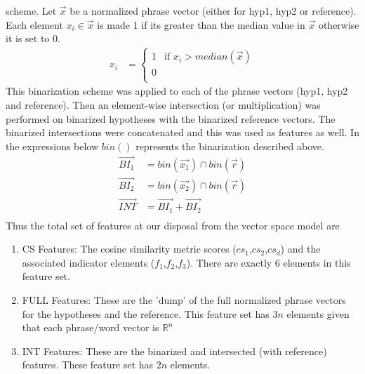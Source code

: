 \documentclass[11pt]{article}
\begin{document}
scheme. Let $\vec{x}$ be a normalized phrase vector (either for hyp1, hyp2 or
reference). Each element $x_i \in \vec{x}$ is made 1 if its greater than the
median value in $\vec{x}$ otherwise it is set to 0.
\begin{align*}
x_i &= \begin{cases} 1 &\mbox{if } x_i > median(\vec{x})\\
0\\
\end{cases}
\end{align*}
This binarization scheme was applied to each of the phrase vectors (hyp1, hyp2
and reference). Then an element-wise intersection (or multiplication) was
performed on binarized hypotheses with the binarized reference vectors. The
binarized intersections were concatenated and this was used as features as well.
In the expressions below $bin()$ represents the binarization described above.
\begin{align*}
\vec{BI_1} &= bin(\vec{x_1}) \cap bin(\vec{r})\\
\vec{BI_2} &= bin(\vec{x_2}) \cap bin(\vec{r})\\
\vec{INT} &= \vec{BI_1} + \vec{BI_2}\\
\end{align*}
Thus the total set of features at our disposal from the vector space model are
\begin{enumerate}
  \item CS Features: The cosine similarity metric scores ($cs_1$,$cs_2$,$cs_d$)
  and the associated indicator elements ($f_1$,$f_2$,$f_3$). There are exactly 6
  elements in this feature set.
  \item FULL Features: These are the 'dump' of the full normalized phrase
  vectors for the hypotheses and the reference. This feature set has $3n$
  elements given that each phrase/word vector is $\mathbb{R}^n$
  \item INT Features: These are the binarized and intersected (with reference)
  features. These feature set has $2n$ elements.
\end{enumerate}
\end{document}
